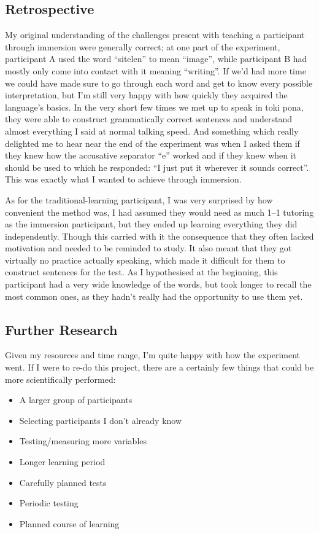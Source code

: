 \documentclass[a4paper,10pt]{article}
\begin{document}
\subsection{Retrospective}
My original understanding of the challenges present with teaching a participant through immersion were
generally correct; at one part of the experiment, participant A used the word ``sitelen'' to mean
``image'', while participant B had mostly only come into contact with it meaning ``writing''. If we'd
had more time we could have made sure to go through each word and get to know every possible
interpretation, but I'm still very happy with how quickly they acquired the language's basics.
In the very short few times we met up to speak in toki pona, they were able to construct grammatically
correct sentences and understand almost everything I said at normal talking speed. And something which
really delighted me to hear near the end of the experiment was when I asked them if they knew how the
accusative separator ``e'' worked and if they knew when it should be used to which he responded:
``I just put it wherever it sounds correct''. This was exactly what I wanted to achieve through immersion.

As for the traditional-learning participant, I was very surprised by how convenient the method was,
I had assumed they would need as much 1--1 tutoring as the immersion participant, but they ended up
learning everything they did independently. Though this carried with it the consequence that they
often lacked motivation and needed to be reminded to study. It also meant that they got virtually no
practice actually speaking, which made it difficult for them to construct sentences for the test. As I
hypothesised at the beginning, this participant had a very wide knowledge of the words, but took longer
to recall the most common ones, as they hadn't really had the opportunity to use them yet.

\subsection{Further Research}
Given my resources and time range, I'm quite happy with how the experiment went. If I were to re-do
this project, there are a certainly few things that could be more scientifically performed:

\begin{itemize}
	\item A larger group of participants
	\item Selecting participants I don't already know
	\item Testing/measuring more variables
	\item Longer learning period
	\item Carefully planned tests
	\item Periodic testing
	\item Planned course of learning
\end{itemize}
\end{document}
